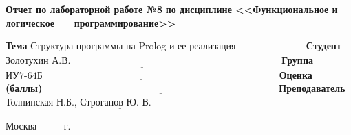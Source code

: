 \documentclass[12pt]{report}
\begin{document}
\begin{titlepage}
		\begin{center}
			\noindent\begin{minipage}{1.1\textwidth}\centering
				\Large\textbf{Отчет по лабораторной работе №8}\newline
				\textbf{по дисциплине <<Функциональное и логическое}\newline
				\textbf{~~~программирование>>}\newline\newline
			\end{minipage}
		\end{center}
		
		\noindent\textbf{Тема} $\underline{\text{Структура программы на Prolog и ее реализация~~~~~~~~~~~~~~~~~~~~~}}$\newline\newline
		\noindent\textbf{Студент} $\underline{\text{Золотухин А.В.~~~~~~~~~~~~~~~~~~~~~~~~~~~~~~~~~~~~~~~~~~~~~~~~~~~~~~~~~~~~~~~~~}}$\newline\newline
		\noindent\textbf{Группа} $\underline{\text{ИУ7-64Б~~~~~~~~~~~~~~~~~~~~~~~~~~~~~~~~~~~~~~~~~~~~~~~~~~~~~~~~~~~~~~~~~~~~~~~~~}}$\newline\newline
		\noindent\textbf{Оценка (баллы)} $\underline{\text{~~~~~~~~~~~~~~~~~~~~~~~~~~~~~~~~~~~~~~~~~~~~~~~~~~~~~~~~~~~~~~~~~~~~~~~~}}$\newline\newline
		\noindent\textbf{Преподаватель} $\underline{\text{Толпинская Н.Б., Строганов Ю. В.~~~~~~~~~~~~~~~~~~~~~~~~~~}}$\newline\newline\newline
		
		\begin{center}
			\vfill
			Москва~---~\the\year
			~г.
		\end{center}
	\end{titlepage}
	
	
\end{document}
